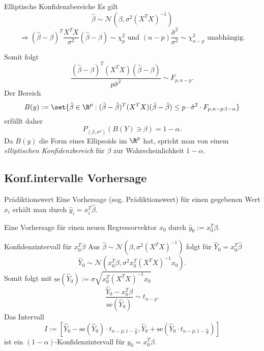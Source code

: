 \begin{karte}{Elliptische Konfidenzbereiche}
Es gilt 
\[ \hat{\beta} \sim \mathcal{N}(\beta, \sigma^2 (X^T X)^{-1}) \]
\[\Rightarrow (\hat{\beta} - \beta)^T \frac{X^T X}{\sigma^2} (\hat{\beta}- \beta) \sim \chi_p^2 \text{ und } (n-p)\frac{\hat{\sigma}^2}{\sigma^2} \sim \chi_{n-p}^2 \text{ unabhängig.} \]

Somit folgt 
\[ \frac{(\hat{\beta} - \beta)^T (X^T X) (\hat{\beta} - \beta)}{p \hat{\sigma}^2} \sim F_{p,n-p}. \]
Der Bereich 
\[ B(y) := \set{ \tilde{\beta} \in \R^p: (\hat{\beta} - \tilde{\beta})^T (X^T X) (\hat{\beta} - \tilde{\beta}) \leq p \cdot \hat{\sigma}^2 \cdot F_{p,n-p;1-\alpha} } \]
erfüllt daher 
\[ P_{(\beta, \sigma^2)}(B(Y) \ni \beta) = 1-\alpha. \]
Da \(B(y)\) die Form eines Ellipsoids im \(\R^p\) hat, spricht man von einem \textit{elliptischen Konfidenzbereich} 
für \(\beta\) zur Wahrscheinlichkeit \(1-\alpha\).
\end{karte}

\subsection{Konf.intervalle Vorhersage}

\begin{karte}{Prädiktionswert}
Eine Vorhersage (sog. Prädiktionswert) für einen gegebenen Wert \(x_i\) erhält man durch 
\(\hat{y}_i = x_i^T \hat{\beta}\).

Eine Vorhersage für einen neuen Regressorvektor \(x_0\) durch \(\hat{y}_0 := x_0^T \beta\).
\end{karte}

\begin{karte}{Konfidenzintervall für \(x_0^T \beta\)}
Aus \(\hat{\beta} \sim \mathcal{N}(\beta, \sigma^2 (X^T X)^{-1})\) folgt für \(\hat{Y}_0 = x_0^T \hat{\beta}\)
\[ \hat{Y}_0 \sim \mathcal{N}(x_0^T \beta, \sigma^2 x_0^T (X^T X)^{-1} x_0). \]
Somit folgt mit \(\mathrm{se}(\hat{Y}_0) := \hat{\sigma} \sqrt{x_0^T (X^T X)^{-1} x_0}\)
\[ \frac{\hat{Y}_0 - x_0^T \beta}{\mathrm{se}(\hat{Y}_0)} \sim t_{n-p}. \]
Das Intervall 
\[ I := \left[ \hat{Y}_0 - \mathrm{se}(\hat{Y}_0) \cdot t_{n-p;1-\frac{\alpha}{2}}, \hat{Y}_0 + \mathrm{se}(\hat{Y}_0 \cdot t_{n-p;1-\frac{\alpha}{2}}) \right] \]
ist ein \((1-\alpha)\)-Konfidenzintervall für \(y_0 = x_0^T \beta\).
\end{karte}

